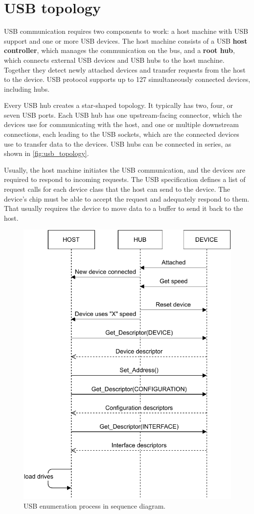 \section{USB topology}
\label{sec:topology}

USB communication requires two components to work: a host machine with USB support and one or more USB devices. The host machine consists of a USB \textbf{host controller}, which manages the communication on the bus, and a \textbf{root hub}, which connects external USB devices and USB hubs to the host machine. Together they detect newly attached devices and transfer requests from the host to the device. USB protocol supports up to 127 simultaneously connected devices, including hubs.

Every USB hub creates a star-shaped topology. It typically has two, four, or seven USB ports. Each USB hub has one upstream-facing connector, which the devices use for communicating with the host, and one or multiple downstream connections, each leading to the USB sockets, which are the connected devices use to transfer data to the devices. USB hubs can be connected in series, as shown in \autoref{fig:usb_topology}.

Usually, the host machine initiates the USB communication, and the devices are required to respond to incoming requests. The USB specification defines a list of request calls for each device class that the host can send to the device. The device's chip must be able to accept the request and adequately respond to them. That usually requires the device to move data to a buffer to send it back to the host.

\begin{figure}[ht]
    \centering
    \includegraphics[width=0.65\linewidth]{obrazky-figures/enumeration_diagram.pdf}
    \caption{USB enumeration process in sequence diagram.}
    \label{fig:enumeration_diagram}
\end{figure}

